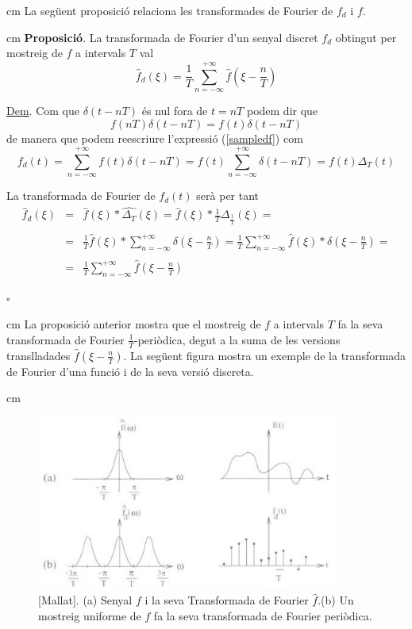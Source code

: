 \documentclass{article}
\begin{document}
 cm
La seg\"uent proposici\'o relaciona les transformades de Fourier de $f_d$
i $f$.

 cm
\noindent
\textbf{Proposici\'o}. La transformada de Fourier d'un senyal discret
$f_d$ obtingut per mostreig de $f$ a intervals $T$ val
\begin{equation}
\label{samplingtheorem}
\hat{f}_d(\xi)=\frac{1}{T} \sum_{n=-\infty}^{+\infty} \hat{f} (\xi - 
\frac{n}{T})
\end{equation}

\noindent
\underline{Dem}. Com que $\delta(t-nT)$ \'es nul fora de $t=nT$
podem dir que 
\[
f(nT) \delta(t-nT) = f(t) \delta(t-nT)
\]
\noindent
de manera que podem reescriure l'expressi\'o (\ref{sampledf}) com
\[
f_d(t)=\sum_{n=-\infty}^{+\infty} f(t) \delta(t-nT)=
f(t) \sum_{n=-\infty}^{+\infty} \delta(t-nT)=f(t) \Delta_T(t)
\]

\noindent
La transformada de Fourier de $f_d(t)$ ser\`a per tant
\[
\begin{array}{lcl}
\hat{f}_d(\xi) & = &\hat{f}(\xi) * \widehat{\Delta_T}(\xi)=
\hat{f}(\xi) * \frac{1}{T} \Delta_{\frac{1}{T}}(\xi) = \\ \\ & = & 
\frac{1}{T} \hat{f}(\xi) * \sum_{n=-\infty}^{+\infty} \delta(\xi-\frac{n}{T})=
\frac{1}{T} \sum_{n=-\infty}^{+\infty} \hat{f}(\xi) * \delta(\xi-\frac{n}{T})=
\\ \\ & = &
\frac{1}{T} \sum_{n=-\infty}^{+\infty} \hat{f}(\xi-\frac{n}{T})
\end{array}
\]
\begin{flushright}
$\square$
\end{flushright}

 cm
La proposici\'o anterior mostra que el mostreig de $f$ a intervals $T$
fa la seva transformada de Fourier $\frac{1}{T}$-peri\`odica, degut a la
suma de les versions translladades $\hat{f}(\xi-\frac{n}{T})$.
La seg\"uent figura mostra un exemple de la transformada de Fourier 
d'una funci\'o i de la seva versi\'o discreta.  

 cm

\begin{figure}[htbp]
\begin{center}
\includegraphics[width=10cm]{imatges/samplingtheorem.eps}
\caption{
[Mallat].
(a) Senyal $f$ i la seva Transformada de Fourier 
$\hat{f}$.(b) Un mostreig uniforme de $f$ fa la seva transformada de Fourier
peri\`odica.}
\label{samplingFT.fig}
\end{center}
\end{figure}
\end{document}
